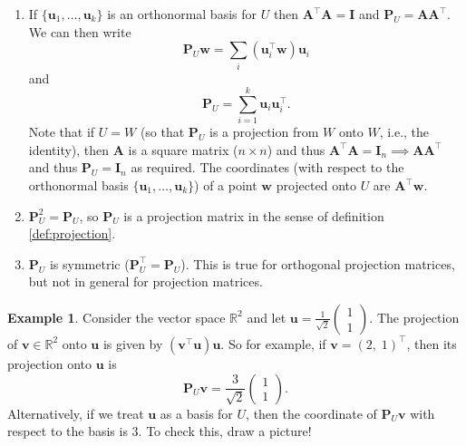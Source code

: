\documentclass[]{book}
\theoremstyle{definition}
\theoremstyle{definition}
\newtheorem{example}{Example}[chapter]
\theoremstyle{definition}
\theoremstyle{remark}
\begin{document}
\begin{enumerate}
\def\labelenumi{\arabic{enumi}.}
\item
  If \(\{\boldsymbol u_1, \ldots, \boldsymbol u_k\}\) is an orthonormal basis for \(U\) then \(\boldsymbol A^\top \boldsymbol A= \mathbf I\) and \(\boldsymbol P_U = \boldsymbol A\boldsymbol A^\top\). We can then write
  \[\boldsymbol P_U\boldsymbol w= \sum_i (\boldsymbol u_i^\top \boldsymbol w) \boldsymbol u_i\]
  and
  \[\boldsymbol P_U = \sum_{i=1}^k \boldsymbol u_i\boldsymbol u_i^\top.\]
  Note that if \(U=W\) (so that \(\boldsymbol P_U\) is a projection from \(W\) onto \(W\), i.e., the identity), then \(\boldsymbol A\) is a square matrix (\(n\times n\)) and thus \(\boldsymbol A^\top\boldsymbol A=\mathbf I_n \implies \boldsymbol A\boldsymbol A^\top\) and thus \(\boldsymbol P_U=\mathbf I_n\) as required. The coordinates (with respect to the orthonormal basis \(\{\boldsymbol u_1, \ldots, \boldsymbol u_k\}\)) of a point \(\boldsymbol w\) projected onto \(U\) are \(\boldsymbol A^\top \boldsymbol w\).
\item
  \(\boldsymbol P_U^2=\boldsymbol P_U\), so \(\boldsymbol P_U\) is a projection matrix in the sense of definition \ref{def:projection}.
\item
  \(\boldsymbol P_U\) is symmetric (\(\boldsymbol P_U^\top=\boldsymbol P_U\)). This is true for orthogonal projection matrices, but not in general for projection matrices.
\end{enumerate}

\begin{example}
\protect\hypertarget{exm:proj2}{}{\label{exm:proj2} }Consider the vector space \(\mathbb{R}^2\) and let \(\boldsymbol u=\frac{1}{\sqrt{2}}\left(\begin{array}{c}1\\1\end{array}\right)\). The projection of \(\boldsymbol v\in \mathbb{R}^2\) onto \(\boldsymbol u\) is given by \((\boldsymbol v^\top \boldsymbol u) \boldsymbol u\). So for example, if \(\boldsymbol v= (2, \; 1)^\top\), then its projection onto \(\boldsymbol u\) is
\[\boldsymbol P_U \boldsymbol v= \frac{3}{\sqrt{2}}\left(\begin{array}{c}1\\1\end{array}\right).\]
Alternatively, if we treat \(\boldsymbol u\) as a basis for \(U\), then the coordinate of \(\boldsymbol P_U \boldsymbol v\) with respect to the basis is \(3\).
To check this, draw a picture!
\end{example}
\end{document}
